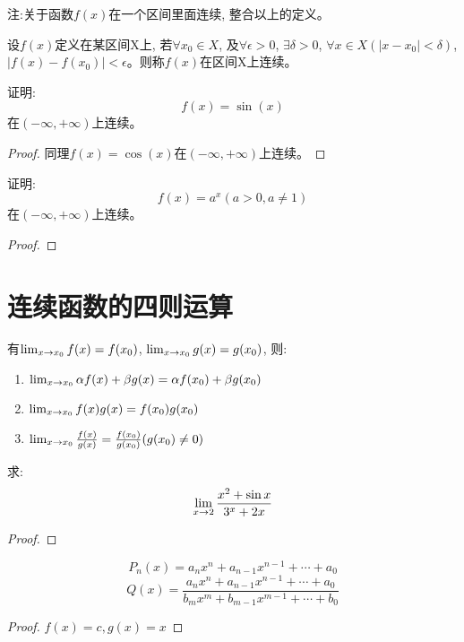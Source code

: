 \documentclass[lang=cn]{elegantbook}
\begin{document}
注:关于函数$f(x)$在一个区间里面连续, 整合以上的定义。
\begin{definition}
    设$f(x)$定义在某区间X上, 若$\forall x_0 \in X$, 及$\forall \epsilon > 0$, $\exists \delta > 0$, $\forall x \in X(\left|x - x_0 \right|<\delta)$, $\left| f(x) - f(x_0) \right| < \epsilon$。则称$f(x)$在区间X上连续。
\end{definition}
\begin{proposition}
    证明:
    \[ f(x) = \sin(x)\]
    在$(-\infty, +\infty)$上连续。
\end{proposition}
\begin{proof}
    同理$f(x) = \cos(x)$在$(-\infty, +\infty)$上连续。
\end{proof}

\begin{proposition}
    证明:
    \[ f(x) = a^x (a > 0, a \neq 1)\]
    在$(-\infty, +\infty)$上连续。
\end{proposition}
\begin{proof}
    
\end{proof}
\section{连续函数的四则运算}
\begin{theorem}
    有$\lim_{x \to x_0 } f(x) = f(x_0)$, $\lim_{x \to x_0 } g(x) = g(x_0)$, 则:
    \begin{enumerate}
        \item $\lim_{x \to x_0 } \alpha f(x) + \beta g(x) = \alpha f(x_0) + \beta g(x_0)$
        \item $\lim_{x \to x_0 } f(x)g(x) = f(x_0)g(x_0)$
        \item $\lim_{x \to x_0 } \frac{f(x)}{g(x)} = \frac{f(x_0)}{g(x_0)}(g(x_0) \neq 0)$
    \end{enumerate}
\end{theorem}

\begin{proposition}
    求:
    \[ \lim_{x \to 2 } \frac{x^2+\sin x}{3^x+2x}\]
\end{proposition}
\begin{proof}
    
\end{proof}

\begin{proposition}
    \[ P_n(x) = a_n x^n + a_{n-1} x^{n-1} + \cdots + a_0\]
    \[ Q(x) = \frac{a_n x^n + a_{n-1} x^{n-1} + \cdots + a_0}{b_m x^m + b_{m-1} x^{m-1} + \cdots + b_0}\]
\end{proposition}
\begin{proof}
    $f(x) = c, g(x) = x$
\end{proof}
\end{document}
